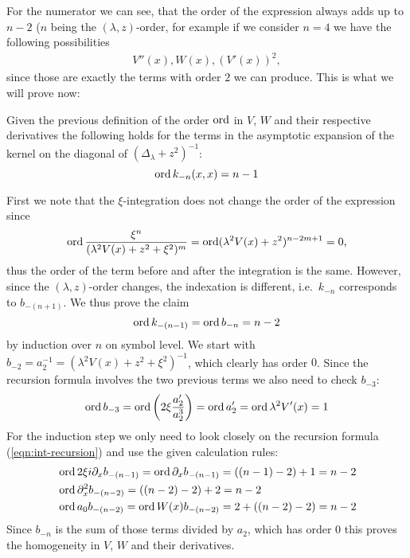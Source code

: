 For the numerator we can see, that the order of the expression always adds up to
$n-2$ ($n$ being the $(\lambda,z)$-order, for example if we consider $n=4$ we
have the following possibilities
\begin{align*}
  V''(x), W(x), (V'(x))^2,
\end{align*}
since those are exactly the terms with order $2$ we can produce. This is what we
will prove now:
\begin{MainTheorem}
  Given the previous definition of the order $\operatorname{ord}$ in $V$, $W$ and their
  respective derivatives the following holds for the terms in the asymptotic
  expansion of the kernel on the diagonal of $(\Delta_\lambda + z^2)^{-1}$:
  \begin{equation}
    \label{eqn:ord-vs-mu-order}
    \operatorname{ord} k_{-n}(x, x) = n - 1
  \end{equation}
  \begin{Proof}
    First we note that the $\xi$-integration does not change the order of the
    expression since
    \begin{equation*}
      \operatorname{ord} \frac{\xi^n}{(\lambda^2 V(x) + z^2 + \xi^2)^m} = \operatorname{ord} (\lambda^2 V(x)
      + z^2)^{n-2m+1} = 0,
    \end{equation*}
    thus the order of the term before and after the integration is the same.
    However, since the $(\lambda,z)$-order changes, the indexation is different,
    i.e.\ $k_{-n}$ corresponds to $b_{-(n+1)}$. We
    thus prove the claim
    \begin{equation*}
      \operatorname{ord} k_{-(n-1)} = \operatorname{ord} b_{-n} = n - 2
    \end{equation*}
    by induction over $n$ on symbol level. We start with $b_{-2} = a_2^{-1} =
    (\lambda^2 V(x) + z^2 + \xi^2)^{-1}$, which clearly has order $0$. Since the
    recursion formula involves the two previous terms we also need to check
    $b_{-3}$:
    \begin{equation*}
      \operatorname{ord} b_{-3} = \operatorname{ord}\left(2\xi \frac{a_2'}{a_2^3}\right) = \operatorname{ord} a_2' = \operatorname{ord}
      \lambda^2 V'(x) = 1
    \end{equation*}
    For the induction step we only need to look closely on the recursion formula
    (\cref{eqn:int-recursion}) and use the given calculation rules:
    \begin{align*}
      &\operatorname{ord} 2\xi i \partial_x b_{-(n-1)} = \operatorname{ord} \partial_x b_{-(n-1)} = ((n-1) - 2) +
      1 = n - 2\\
      &\operatorname{ord} \partial_x^2 b_{-(n-2)} = ((n - 2) - 2) + 2 = n - 2 \\
      &\operatorname{ord} a_0 b_{-(n-2)} = \operatorname{ord} W(x) b_{-(n-2)} = 2 + ((n-2) - 2) = n - 2
    \end{align*}
    Since $b_{-n}$ is the sum of those terms divided by $a_2$, which has order
    $0$ this proves the homogeneity in $V$, $W$ and their derivatives.
  \end{Proof}
\end{MainTheorem}
